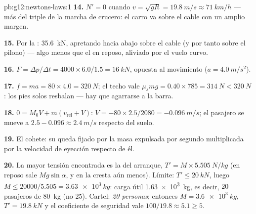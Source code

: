 \begin{solution}{pb:g12:newtons-laws:1}
\textbf{14.} $N' = 0$ cuando
$v = \sqrt{gR} = \qty{19.8}{m/s} \approx \qty{71}{km/h}$ --- más del
triple de la marcha de crucero: el carro va sobre el cable con un amplio
margen.

\textbf{15.} Por la : \qty{35.6}{kN}, apretando
hacia abajo sobre el cable (y por tanto sobre el pilono) --- algo menos
que el  en reposo, aliviado por el vuelo curvo.

\textbf{16.} $F = \Delta p/\Delta t = 4000 \times 6.0/1.5 =
\qty{16}{kN}$, opuesta al movimiento ($a = \qty{4.0}{m/s^2}$).

\textbf{17.} $f = ma = 80 \times 4.0 = \qty{320}{N}$; el techo vale
$\mu_s mg = 0.40 \times 785 = \qty{314}{N} < \qty{320}{N}$: los pies
solos resbalan --- hay que agarrarse a la barra.

\textbf{18.} $0 = M_0 V + m(v_{\text{rel}} + V)$:
$V = -80 \times 2.5/2080 = \qty{-0.096}{m/s}$; el pasajero se mueve a
$2.5 - 0.096 \approx \qty{2.4}{m/s}$ respecto del suelo.

\textbf{19.} El cohete: su  queda fijado por la masa expulsada
por segundo multiplicada por la velocidad de eyección respecto de él.

\textbf{20.} La mayor tensión encontrada es la del arranque,
$T' = M \times \qty{5.505}{N/kg}$ (en reposo sale $Mg\sin\alpha$, y en la
cresta aún menos). Límite: $T' \leq \qty{20}{kN}$, luego
$M \leq 20000/5.505 = \qty{3.63e3}{kg}$: carga útil \qty{1.63e3}{kg}, es
decir, $20$ pasajeros de \qty{80}{kg} (no $25$). Cartel: \emph{20
personas}; entonces $M = \qty{3.6e3}{kg}$, $T' = \qty{19.8}{kN}$ y el
coeficiente de seguridad vale $100/19.8 \approx 5.1 \geq 5$.
\end{solution}
